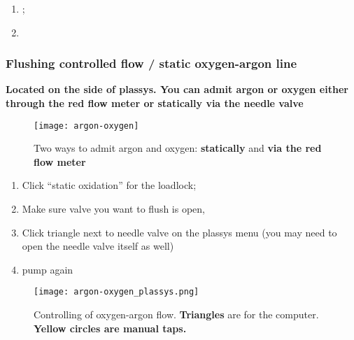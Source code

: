  \begin{enumerate}
 \item {};
 \item {}
 \end{enumerate}

 \subsubsection{Flushing controlled flow / static oxygen-argon line}
 \label{sec:flush-contr-flow}

\begin{framed}\noindent
  \textbf{Located on  the side  of plassys.  You  can admit  argon or
    oxygen either  through the red  flow meter or statically  via the
    needle valve}
\end{framed}

 \begin{figure}[h]
   \centering \texttt{[image: argon-oxygen]}
   \caption{\small   Two   ways   to    admit   argon   and   oxygen:
     \textbf{statically}    and    \textbf{via     the    red    flow
       meter}\label{fig:argon-oxygen}}
 \end{figure}

 \begin{enumerate}
 \item Click ``static oxidation'' for the loadlock;
 \item Make sure valve you want to flush is open, 
 \item Click triangle  next to needle valve on the  plassys menu (you
   may need to open the needle valve itself as well)
 \item \textbf{} \ira pump again
 \end{enumerate}


 \begin{figure}[h]
   \centering \texttt{[image: argon-oxygen\_plassys.png]}
   \caption{\small     Controlling      of     oxygen-argon     flow.
     \textbf{Triangles} are for the computer.  \textbf{Yellow circles
       are                                                     manual
       taps.}\label{fig:argon-oxygen_plassys} \label{fig:argon-oxygen_plassys}}
 \end{figure}

 \newpage


